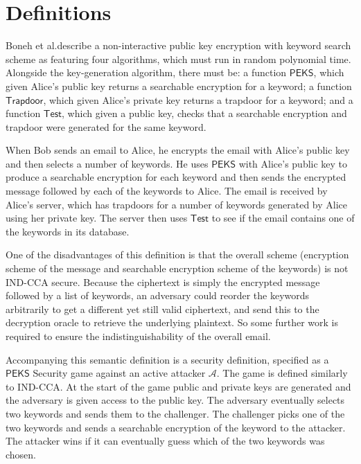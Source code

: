 \documentclass[a4paper,11pt]{article}
\begin{document}
    \section{Definitions}

    Boneh et al.\@ describe a non-interactive public key encryption with keyword search scheme as featuring four algorithms, which must run in random polynomial time. Alongside the key-generation algorithm, there must be: a function $\mathsf{PEKS}$, which given Alice's public key returns a searchable encryption for a keyword; a function $\mathsf{Trapdoor}$, which given Alice's private key returns a trapdoor for a keyword; and a function $\mathsf{Test}$, which given a public key, checks that a searchable encryption and trapdoor were generated for the same keyword.

    When Bob sends an email to Alice, he encrypts the email with Alice's public key and then selects a number of keywords. He uses $\mathsf{PEKS}$ with Alice's public key to produce a searchable encryption for each keyword and then sends the encrypted message followed by each of the keywords to Alice. The email is received by Alice's server, which has trapdoors for a number of keywords generated by Alice using her private key. The server then uses $\mathsf{Test}$ to see if the email contains one of the keywords in its database.

    One of the disadvantages of this definition is that the overall scheme (encryption scheme of the message and searchable encryption scheme of the keywords) is not IND-CCA secure. Because the ciphertext is simply the encrypted message followed by a list of keywords, an adversary could reorder the keywords arbitrarily to get a different yet still valid ciphertext, and send this to the decryption oracle to retrieve the underlying plaintext. So some further work is required to ensure the indistinguishability of the overall email.

    Accompanying this semantic definition is a security definition, specified as a $\mathsf{PEKS}$ Security game against an active attacker $\mathcal{A}$. The game is defined similarly to IND-CCA. At the start of the game public and private keys are generated and the adversary is given access to the public key. The adversary eventually selects two keywords and sends them to the challenger. The challenger picks one of the two keywords and sends a searchable encryption of the keyword to the attacker. The attacker wins if it can eventually guess which of the two keywords was chosen.
\end{document}
